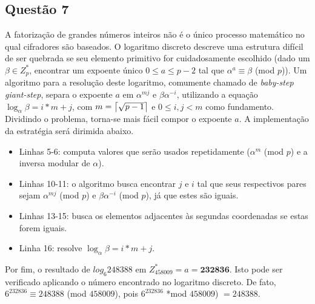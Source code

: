 \documentclass{article}
\DeclarePairedDelimiter{\ceil}{\lceil}{\rceil}
\begin{document}
\subsection*{Questão 7}
A fatorização de grandes números inteiros não é o único processo matemático no qual cifradores são baseados. O logaritmo discreto descreve uma estrutura difícil de ser quebrada se seu elemento primitivo for cuidadosamente escolhido (dado um $\beta \in Z^{*}_{p}$, encontrar um expoente único $0 \leq a \leq p-2$ tal que $\alpha^{a} \equiv \beta$ (mod $p$)). Um algoritmo para a resolução deste logaritmo, comumente chamado de \textit{baby-step giant-step}, separa o expoente $a$ em $\alpha^{mj}$ e $\beta\alpha^{-i}$, utilizando a equação $\log_{\alpha}\beta = i * m + j$, com $m = \ceil[\big]{\sqrt{p-1}}$ e $0 \leq i, j < m$ como fundamento. Dividindo o problema, torna-se mais fácil compor o expoente $a$. A implementação da estratégia será dirimida abaixo.
\begin{itemize}

\item Linhas 5-6: computa valores que serão usados repetidamente ($\alpha^{m}$ (mod $p$) e a inversa modular de $\alpha$).
\item Linhas 10-11: o algoritmo busca encontrar $j$ e $i$ tal que seus respectivos pares sejam $\alpha^{mj}$ (mod $p$) e $\beta\alpha^{-i}$ (mod $p$), já que estes são iguais.
\item Linhas 13-15: busca os elementos adjacentes às segundas coordenadas se estas forem iguais.
\item Linha 16: resolve $\log_{\alpha}\beta = i * m + j$.
\end{itemize}
Por fim, o resultado de $log_{6}248388$ em $Z^{*}_{458009} = a = \textbf{232836}$. Isto pode ser verificado aplicando o número encontrado no logaritmo discreto. De fato, $6^{232836} \equiv 248388$ (mod $458009$), pois $6^{232836}$ *mod $458009$) $= 248388$.
\end{document}
